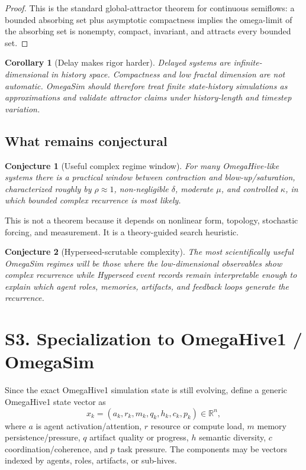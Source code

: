 \documentclass[11pt]{article}
\newtheorem{corollary}{Corollary}
\newtheorem{conjecture}{Conjecture}
\begin{document}
\begin{proof}
This is the standard global-attractor theorem for continuous semiflows: a bounded
absorbing set plus asymptotic compactness implies the omega-limit of the absorbing
set is nonempty, compact, invariant, and attracts every bounded set.
\end{proof}

\begin{corollary}[Delay makes rigor harder]
Delayed systems are infinite-dimensional in history space.  Compactness and low
fractal dimension are not automatic.  OmegaSim should therefore treat finite
state-history simulations as approximations and validate attractor claims under
history-length and timestep variation.
\end{corollary}

\subsection{What remains conjectural}

\begin{conjecture}[Useful complex regime window]
For many OmegaHive-like systems there is a practical window between contraction
and blow-up/saturation, characterized roughly by $\rho\approx1$, non-negligible
$\delta$, moderate $\mu$, and controlled $\kappa$, in which bounded complex
recurrence is most likely.
\end{conjecture}

This is not a theorem because it depends on nonlinear form, topology, stochastic
forcing, and measurement.  It is a theory-guided search heuristic.

\begin{conjecture}[Hyperseed-scrutable complexity]
The most scientifically useful OmegaSim regimes will be those where the
low-dimensional observables show complex recurrence while Hyperseed event records
remain interpretable enough to explain which agent roles, memories, artifacts,
and feedback loops generate the recurrence.
\end{conjecture}

\section{S3. Specialization to OmegaHive1 / OmegaSim}

Since the exact OmegaHive1 simulation state is still evolving, define a generic
OmegaHive1 state vector as
\[
  x_k=(a_k,r_k,m_k,q_k,h_k,c_k,p_k)\in\mathbb R^n,
\]
where $a$ is agent activation/attention, $r$ resource or compute load, $m$ memory
persistence/pressure, $q$ artifact quality or progress, $h$ semantic diversity,
$c$ coordination/coherence, and $p$ task pressure.  The components may be vectors
indexed by agents, roles, artifacts, or sub-hives.
\end{document}
